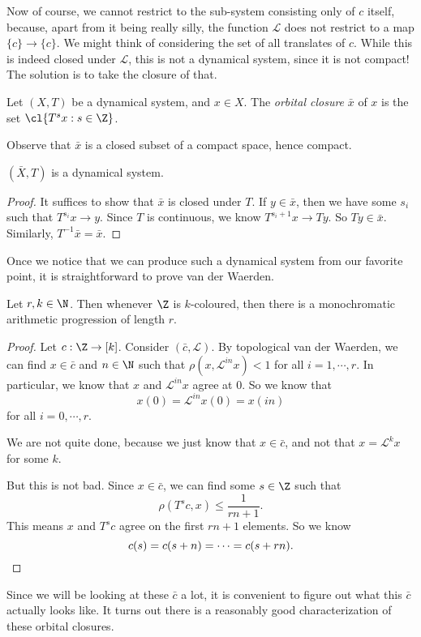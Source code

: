 \documentclass[a4paper]{article}
\begin{document}
Now of course, we cannot restrict to the sub-system consisting only of $c$ itself, because, apart from it being really silly, the function $\mathcal{L}$ does not restrict to a map $\{c\} \to \{c\}$. We might think of considering the set of all translates of $c$. While this is indeed closed under $\mathcal{L}$, this is not a dynamical system, since it is not compact! The solution is to take the closure of that.

\begin{defi}
  Let $(X, T)$ be a dynamical system, and $x \in X$. The \emph{orbital closure} $\bar{x}$ of $x$ is the set $\cl \{T^s x: s \in \Z\}$.
\end{defi}
Observe that $\bar{x}$ is a closed subset of a compact space, hence compact.

\begin{prop}
  $(\bar{X}, T)$ is a dynamical system.
\end{prop}

\begin{proof}
  It suffices to show that $\bar{x}$ is closed under $T$. If $y \in \bar{x}$, then we have some $s_i$ such that $T^{s_i}x \to y$. Since $T$ is continuous, we know $T^{s_i + 1}x \to T y$. So $T y \in \bar{x}$. Similarly, $T^{-1}\bar{x} = \bar{x}$.
\end{proof}

Once we notice that we can produce such a dynamical system from our favorite point, it is straightforward to prove van der Waerden.
\begin{cor}
  Let $r, k \in \N$. Then whenever $\Z$ is $k$-coloured, then there is a monochromatic arithmetic progression of length $r$.
\end{cor}

\begin{proof}
  Let $c: \Z \to [k]$. Consider $(\bar{c}, \mathcal{L})$. By topological van der Waerden, we can find $x \in \bar{c}$ and $n \in \N$ such that $\rho(x, \mathcal{L}^{in} x) < 1$ for all $i = 1, \cdots, r$. In particular, we know that $x$ and $\mathcal{L}^{in} x$ agree at $0$. So we know that
  \[
    x(0) = \mathcal{L}^{in} x(0) = x(in)
  \]
  for all $i = 0, \cdots, r$.

  We are not quite done, because we just know that $x \in \bar{c}$, and not that $x = \mathcal{L}^k x$ for some $k$.

  But this is not bad. Since $x \in \bar{c}$, we can find some $s \in \Z$ such that
  \[
    \rho(T^s c, x) \leq \frac{1}{rn + 1}.
  \]
  This means $x$ and $T^s c$ agree on the first $rn + 1$ elements. So we know
  \[
    c(s) = c(s + n) = \cdots = c(s + rn).\qedhere
  \]
\end{proof}
Since we will be looking at these $\bar{c}$ a lot, it is convenient to figure out what this $\bar{c}$ actually looks like. It turns out there is a reasonably good characterization of these orbital closures.
\end{document}
